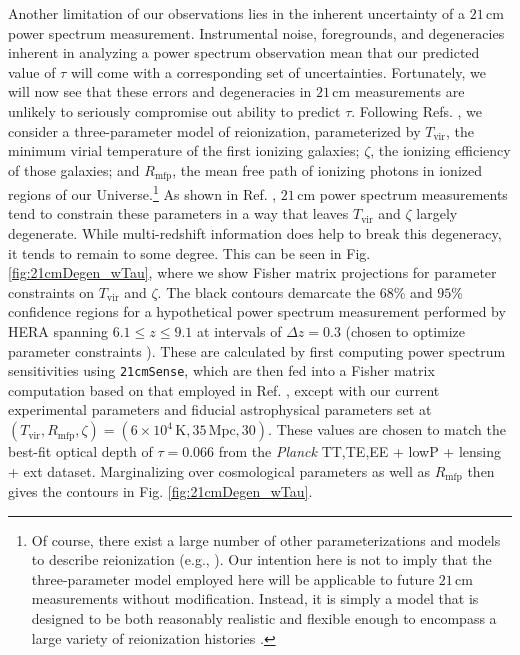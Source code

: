 \documentclass[twocolumn,aps,prd,nofootinbib,showpacs,superscriptaddress]{revtex4-1}
\begin{document}
Another limitation of our observations lies in the inherent uncertainty of a $21\,\textrm{cm}$ power spectrum measurement. Instrumental noise, foregrounds, and degeneracies inherent in analyzing a power spectrum observation mean that our predicted value of $\tau$ will come with a corresponding set of uncertainties. Fortunately, we will now see that these errors and degeneracies in $21\,\textrm{cm}$ measurements are unlikely to seriously compromise out ability to predict $\tau$. Following Refs. \cite{mesinger_et_al2012,pober_et_al2014}, we consider a three-parameter model of reionization, parameterized by $T_\textrm{vir}$, the minimum virial temperature of the first ionizing galaxies; $\zeta$, the ionizing efficiency of those galaxies; and $R_\textrm{mfp}$, the mean free path of ionizing photons in ionized regions of our Universe.\footnote{Of course, there exist a large number of other parameterizations and models to describe reionization (e.g., \cite{zahn_et_al2011,battaglia_et_al2013,laplante_et_al2014,gnedin_et_al2014,kaurov2015}). Our intention here is not to imply that the three-parameter model employed here will be applicable to future $21\,\textrm{cm}$ measurements without modification. Instead, it is simply a model that is designed to be both reasonably realistic and flexible enough to encompass a large variety of reionization histories \cite{mesinger_et_al2012}.} As shown in Ref. \cite{pober_et_al2014}, $21\,\textrm{cm}$ power spectrum measurements tend to constrain these parameters in a way that leaves $T_\textrm{vir}$ and $\zeta$ largely degenerate. While multi-redshift information does help to break this degeneracy, it tends to remain to some degree. This can be seen in Fig. \ref{fig:21cmDegen_wTau}, where we show Fisher matrix projections for parameter constraints on $T_\textrm{vir}$ and $\zeta$. The black contours demarcate the $68\%$ and $95\%$ confidence regions for a hypothetical power spectrum measurement performed by HERA spanning $6.1 \leq z \leq 9.1$ at intervals of $\Delta z = 0.3$ (chosen to optimize parameter constraints \cite{Liu_in_prep}). These are calculated by first computing power spectrum sensitivities using {\tt 21cmSense}, which are then fed into a Fisher matrix computation based on that employed in Ref. \cite{pober_et_al2014}, except with our current experimental parameters and fiducial astrophysical parameters set at $(T_\textrm{vir}, R_\textrm{mfp}, \zeta) = (6 \times 10^4\,\textrm{K}, 35\,\textrm{Mpc}, 30)$. These values are chosen to match the best-fit optical depth of $\tau =0.066$ from the \emph{Planck} TT,TE,EE + lowP + lensing + ext dataset. Marginalizing over cosmological parameters as well as $R_\textrm{mfp}$ then gives the contours in Fig. \ref{fig:21cmDegen_wTau}.
\end{document}
